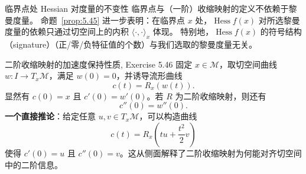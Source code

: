 \documentclass[11pt,a4paper]{article}
\renewcommand{\*}{\leftindex^*}
\DeclareMathOperator{\Hess}{Hess}
\newcommand{\cM}{\mathcal{M}} \newcommand{\cN}{\mathcal{N}}
\begin{document}
\begin{remark}{临界点处 Hessian 对度量的不变性}{}
临界点与（一阶）收缩映射的定义不依赖于黎曼度量。
命题~\ref{prop:5.45} 进一步表明：在临界点 $x$ 处，$\Hess f(x)$ 对所选黎曼度量的依赖只通过切空间上的内积 $\langle\cdot,\cdot\rangle_x$ 体现。
特别地，$\Hess f(x)$ 的符号结构（signature）（正/零/负特征值的个数）与我们选取的黎曼度量无关。
\end{remark}

\begin{remark}{二阶收缩映射的加速度保持性质, Exercise 5.46}{}
固定 $x\in\cM$，取切空间曲线 $w:I\to T_x\cM$，满足 $w(0)=0$，并诱导流形曲线
\[
c(t)=R_x(w(t)).
\]
显然有 $c(0)=x$ 且 $c'(0)=w'(0)$。若 $R$ 为二阶收缩映射，则还有
\[
c''(0)=w''(0).
\]
\textbf{一个直接推论}：给定任意 $u,v\in T_x\cM$，可以构造曲线
\[
c(t)=R_x\!\left(tu+\frac{t^2}{2}v\right)
\]
使得 $c'(0)=u$ 且 $c''(0)=v$。这从侧面解释了二阶收缩映射为何能对齐切空间中的二阶信息。
\end{remark}

\nocite{boumal2023introduction}


\end{document}
